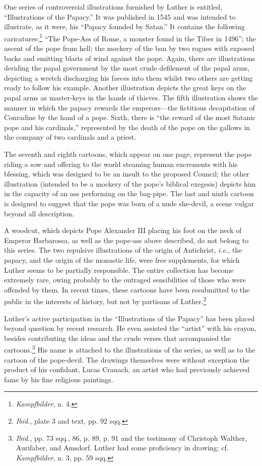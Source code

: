 One series of controversial illustrations furnished by Luther is entitled,
“Illustrations of the Papacy.” It was published in 1545 and
was intended to illustrate, as it were, his “Papacy founded by Satan.”
It contains the following caricatures:\footnote{\textit{Kampfbilder}, n. 4.}
“The Pope-Ass of Rome, a
monster found in the Tiber in 1496”; the ascent of the pope from
hell; the mockery of the ban by two rogues with exposed backs and
emitting blasts of wind against the pope. Again, there are illustrations
deriding the papal government by the most crude defilement of
the papal arms, depicting a wretch discharging his faeces into them
whilst two others are getting ready to follow his example. Another
illustration depicts the great keys on the papal arms as master-keys in
the hands of thieves. The fifth illustration shows the manner in which
the papacy rewards the emperors—the fictitious decapitation of Conradine
by the hand of a pope. Sixth, there is “the reward of the most
Satanic pope and his cardinals,” represented by the death of the
pope on the gallows in the company of two cardinals and a priest.

The seventh and eighth cartoons, which appear on one page, represent
the pope riding a sow and offering to the world steaming human excrements
with his blessing, which was designed to be an insult to the
proposed Council; the other illustration (intended to be a mockery
of the pope’s biblical exegesis) depicts him in the capacity of an ass
performing on the bag-pipe. The last and ninth cartoon is designed to
suggest that the pope was born of a nude she-devil, a scene vulgar
beyond all description.

A woodcut, which depicts Pope Alexander III placing his foot on
the neck of Emperor Barbarossa, as well as the pope-ass above described,
do not belong to this series. The two repulsive illustrations of
the origin of Antichrist, \textit{i.e.}, the papacy, and the origin of the monastic
life, were free supplements, for which Luther seems to be partially responsible.
The entire collection has become extremely rare,
owing probably to the outraged sensibilities of those who were offended
by them. In recent times, these cartoons have been resubmitted to the
public in the interests of history, but not by partisans of Luther.\footnote{\textit{Ibid.}, plate 3 and text, pp. 92 sqq.}

Luther’s active participation in the “Illustrations of the Papacy”
has been placed beyond question by recent research. He even assisted
the “artist” with his crayon, besides contributing the ideas
and the crude verses that accompanied the cartoons.\footnote
{\textit{Ibid.}, pp. 73 sqq., 86, p. 89, p. 91 and the testimony of Christoph Walther, Aurifaber,
and Amsdorf. Luther had some proficiency in drawing; cf. \textit{Kampfbilder}, n. 3, pp. 59 sqq.}
His name is
attached to the illustrations of the series, as well as to the cartoon of
the pope-devil. The drawings themselves were without exception the
product of his confidant, Lucas Cranach, an artist who had previously
achieved fame by his fine religious paintings.

